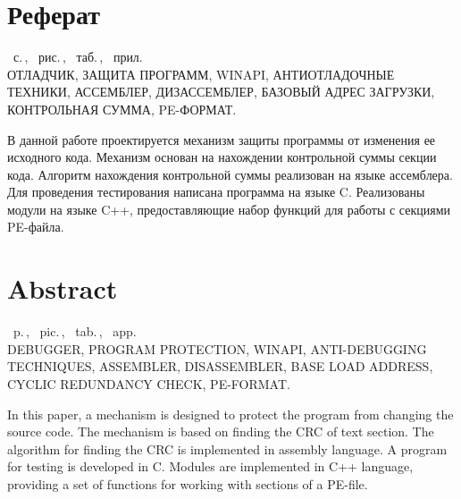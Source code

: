 \chapter*{Реферат}

\begin{center}
  \ztotpages\ с.\,, \totalfigures\ рис.\,, \totaltables\ таб.\,, 
  \totalappendixCounters\ прил.\\
  \vspace{4mm}
  \MakeUppercase{отладчик, защита программ, WinAPI, антиотладочные техники,
  ассемблер, дизассемблер, базовый адрес загрузки, контрольная сумма,
  PE-формат.}
\end{center}

В данной работе проектируется механизм защиты программы от изменения ее
исходного кода. Механизм основан на нахождении контрольной суммы секции кода.
Алгоритм нахождения контрольной суммы реализован на языке ассемблера. Для
проведения тестирования написана программа на языке C. Реализованы модули на
языке C++, предоставляющие набор функций для работы с секциями PE-файла.


\chapter*{Abstract}
\begin{center}
  \ztotpages\ p.\,, \totalfigures\ pic.\,, \totaltables\ tab.\,, 
  \totalappendixCounters\ app.\\
  \vspace{4mm}
  \MakeUppercase{debugger, program protection, WinAPI, anti-debugging techniques,
  assembler, disassembler, base load address, cyclic redundancy check,
  PE-format.}
\end{center}

In this paper, a mechanism is designed to protect the program from changing the
source code. The mechanism is based on finding the CRC of text section. The
algorithm for finding the CRC is implemented in assembly language. A program for
testing is developed in C. Modules are implemented in C++ language, providing a
set of functions for working with sections of a PE-file.
